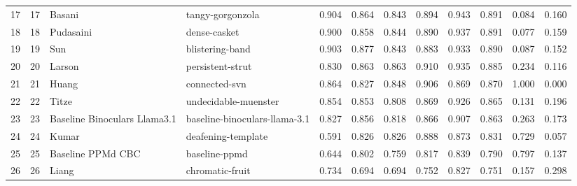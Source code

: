 \begin{tabular}{lrllrrrrrrrr}
17 & 17 & Basani & tangy-gorgonzola & 0.904 & 0.864 & 0.843 & 0.894 & 0.943 & 0.891 & 0.084 & 0.160 \\
18 & 18 & Pudasaini & dense-casket & 0.900 & 0.858 & 0.844 & 0.890 & 0.937 & 0.891 & 0.077 & 0.159 \\
19 & 19 & Sun & blistering-band & 0.903 & 0.877 & 0.843 & 0.883 & 0.933 & 0.890 & 0.087 & 0.152 \\
20 & 20 & Larson & persistent-strut & 0.830 & 0.863 & 0.863 & 0.910 & 0.935 & 0.885 & 0.234 & 0.116 \\
21 & 21 & Huang & connected-svn & 0.864 & 0.827 & 0.848 & 0.906 & 0.869 & 0.870 & 1.000 & 0.000 \\
22 & 22 & Titze & undecidable-muenster & 0.854 & 0.853 & 0.808 & 0.869 & 0.926 & 0.865 & 0.131 & 0.196 \\
23 & 23 & Baseline Binoculars Llama3.1 & baseline-binoculars-llama-3.1 & 0.827 & 0.856 & 0.818 & 0.866 & 0.907 & 0.863 & 0.263 & 0.173 \\
24 & 24 & Kumar & deafening-template & 0.591 & 0.826 & 0.826 & 0.888 & 0.873 & 0.831 & 0.729 & 0.057 \\
25 & 25 & Baseline PPMd CBC & baseline-ppmd & 0.644 & 0.802 & 0.759 & 0.817 & 0.839 & 0.790 & 0.797 & 0.137 \\
26 & 26 & Liang & chromatic-fruit & 0.734 & 0.694 & 0.694 & 0.752 & 0.827 & 0.751 & 0.157 & 0.298 \\
\bottomrule
\end{tabular}
